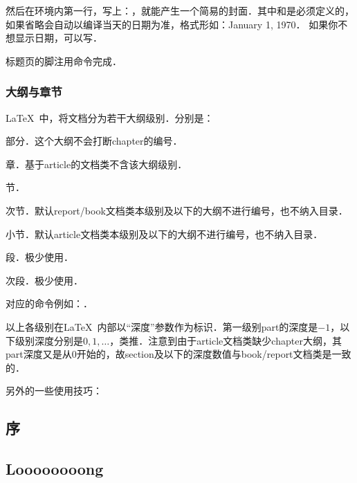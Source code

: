 然后在环境内第一行，写上：，就能产生一个简易的封面．其中和是必须定义的，如果省略会自动以编译当天的日期为准，格式形如：January 1, 1970． 如果你不想显示日期，可以写．

标题页的脚注用命令完成．

\subsection{大纲与章节}
\LaTeX\ 中，将文档分为若干大纲级别．分别是：
\begin{para}
\item[\latexline{part}] 部分．这个大纲不会打断chapter的编号．
\item[\latexline{chapter}] 章．基于article的文档类不含该大纲级别．
\item[\latexline{section}] 节．
\item[\latexline{subsection}] 次节．默认report/book文档类本级别及以下的大纲不进行编号，也不纳入目录．
\item[\latexline{subsubsection}] 小节．默认article文档类本级别及以下的大纲不进行编号，也不纳入目录．
\item[\latexline{paragraph}] 段．极少使用．
\item[\latexline{subparagraph}] 次段．极少使用．
\end{para}

对应的命令例如：．

以上各级别在\LaTeX\ 内部以“深度”参数作为标识．第一级别part的深度是$-1$，以下级别深度分别是$0,1,\ldots$，类推．注意到由于article文档类缺少chapter大纲，其part深度又是从$0$开始的，故section及以下的深度数值与book/report文档类是一致的．\dpar

另外的一些使用技巧：
\begin{latex}
\setcounter{tocdepth}{2}
\chapter*{序}
\section[Short]{Loooooooong}
\renewcommand{\chaptername}{CHAPTER}
\end{latex}

